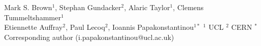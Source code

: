 Mark S. Brown${}^1$, Stephan Gundacker${}^2$, Alaric Taylor${}^1$, Clemens Tummeltshammer${}^1$\\ 
Etiennette Auffray${}^2$, Paul Lecoq${}^2$, Ioannis Papakonstantinou${}^{1*}$
${}^1$ UCL
${}^2$ CERN
${}^*$ Corresponding author (i.papakonstantinou@ucl.ac.uk)
